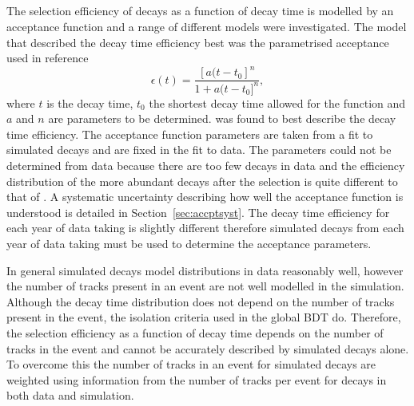 \subsection{\bsmumu}%
\label{sec:signalDTpdf}
The selection efficiency of \bsmumu decays as a function of decay time is modelled by an acceptance function and a range of different models were investigated. The model that described the \bsmumu decay time efficiency best was the parametrised acceptance used in reference~\cite{LHCb:2011ab} 
\begin{equation}
\epsilon(t) = \frac{[a(t - t_{0}]^{n}}{1 + a(t - t_{0}]^{n}},
\label{eq:accpt}
\end{equation}
where $t$ is the decay time, $t_0$ the shortest decay time allowed for the function and $a$ and $n$ are parameters to be determined.  was found to best describe the \bsmumu decay time efficiency. The acceptance function parameters are taken from a fit to simulated \bsmumu decays and are fixed in the fit to data. The parameters could not be determined from data because there are too few \bsmumu decays in data and the efficiency distribution of the more abundant \bhh decays after the selection is quite different to that of \bsmumu. A systematic uncertainty describing how well the acceptance function is understood is detailed in Section~\ref{sec:accptsyst}. The decay time efficiency for each year of data taking is slightly different therefore simulated decays from each year of data taking must be used to determine the acceptance parameters.


In general simulated decays model distributions in data reasonably well, however the number of tracks present in an event are not well modelled in the simulation. %
Although the \bsmumu decay time distribution does not depend on the number of tracks present in the event, the isolation criteria used in the global BDT do. Therefore, the selection efficiency as a function of decay time depends on the number of tracks in the event and cannot be accurately described by simulated decays alone. To overcome this the number of tracks in an event for simulated \bsmumu decays are weighted using information from the number of tracks per event for \bdkpi decays in both data and simulation. 

